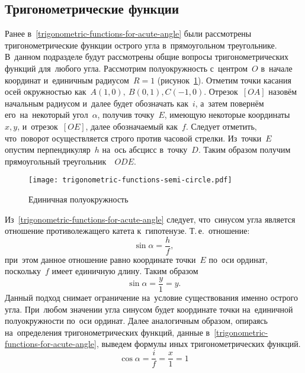 \documentclass[]{scrartcl}
\begin{document}
\subsection{Тригонометрические функции}\label{trigonometric-functions}
Ранее в~\ref{trigonometric-functions-for-acute-angle} были рассмотрены тригонометрические функции острого угла в~прямоугольном треугольнике. В~данном подразделе будут рассмотрены общие вопросы тригонометрических функций для~любого угла. Рассмотрим полуокружность с~центром~${\textstyle O}$ в~начале координат и~единичным радиусом~${\textstyle R=1}$ (рисунок~\ref{fig:trigonometric-functions-semi-circle}). Отметим точки касания осей окружностью как~${\textstyle A(1,0),\ B(0,1), C(-1,0)}$. Отрезок~${\textstyle [OA]}$ назовём начальным радиусом и~далее будет обозначать как~${\textstyle i}$, а~затем повернём его~на~некоторый угол~${\textstyle \alpha}$, получив точку~${\textstyle E}$, имеющую некоторые координаты~${\textstyle x,y}$, и~отрезок~${\textstyle [OE]}$, далее обозначаемый как~${\textstyle f}$. Следует отметить, что~поворот осуществляется строго против часовой стрелки. Из~точки~${\textstyle E}$ опустим перпендикуляр~${\textstyle h}$ на~ось абсцисс в~точку~${\textstyle D}$. Таким образом получим прямоугольный треугольник~~${\textstyle ODE}$.
\begin{figure}[ht]
	\centering %
	\texttt{[image: trigonometric-functions-semi-circle.pdf]}
	\caption{Единичная полуокружность}\label{fig:trigonometric-functions-semi-circle}
\end{figure}
Из~\ref{trigonometric-functions-for-acute-angle} следует, что~синусом угла является отношение противолежащего катета к~гипотенузе. Т.\,е.~отношение:
\begin{equation}\label{eq:sinus-formula-1}
\sin \alpha = \frac{h}{f},
\end{equation} 
при~этом данное отношение равно координате точки~${\textstyle E}$ по~оси ординат, поскольку~${\textstyle f}$ имеет единичную длину. Таким образом
\begin{equation}\label{eq:sinus-formula-2}
\sin \alpha = \frac{y}{1}=y.
\end{equation}
Данный подход снимает ограничение на~условие существования именно острого угла. При~любом значении угла синусом будет координате точки на~единичной полуокружности по~оси ординат. Далее аналогичным образом, опираясь на~определения тригонометрических функций, данные в~\ref{trigonometric-functions-for-acute-angle}, выведем формулы иных тригонометрических функций.
\begin{equation}\label{eq:cosinus-formula-1}
\cos \alpha = \frac{i}{f}=\frac{x}{1}=1
\end{equation}
\end{document}
